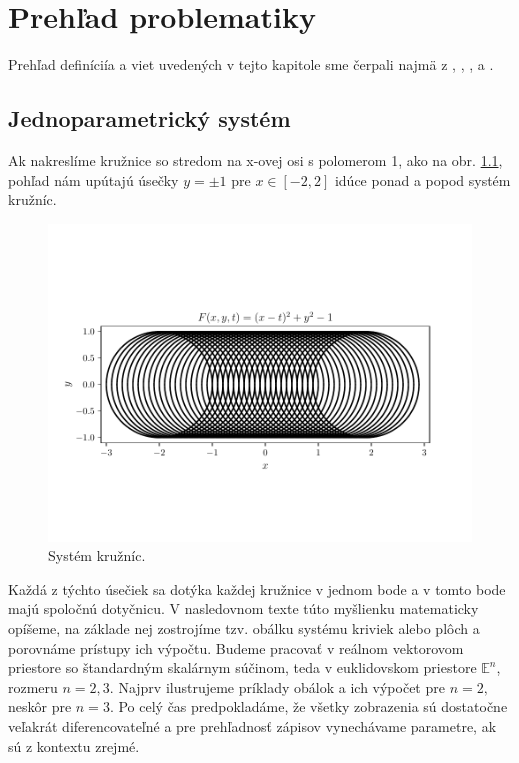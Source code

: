 \chapter{Prehľad problematiky}
\label{kap:kapitola1}
Prehľad definíciía a viet uvedených v tejto kapitole sme čerpali najmä z \cite{Bru92}, \cite{Bru81}, \cite{doCarmo17}, \cite{Ode20} a \cite{Vra22}.

\section{Jednoparametrický systém}
Ak nakreslíme kružnice so stredom na x-ovej osi s polomerom 1, ako na obr. \ref{fig:system}, pohľad nám upútajú úsečky $y = \pm 1$ pre $ x \in [-2,2]$ idúce ponad a popod systém kružníc.

\begin{figure}[h]
	\centering
	\includegraphics[trim={0.5cm 2.8cm 0.5cm 3.3cm},clip]{images/system.pdf}
	\caption[Systém kružníc.]{Systém kružníc.}
	\label{fig:system}
\end{figure}

Každá z týchto úsečiek sa dotýka každej kružnice v jednom bode a v tomto bode majú spoločnú dotyčnicu. V nasledovnom texte túto myšlienku matematicky opíšeme, na základe nej zostrojíme tzv. obálku systému kriviek alebo plôch a porovnáme prístupy ich výpočtu. Budeme pracovať v reálnom vektorovom priestore so štandardným skalárnym súčinom, teda v euklidovskom priestore $\mathbb{E}^{n}$, rozmeru $n = 2, 3.$ Najprv ilustrujeme príklady obálok a ich výpočet pre $ n = 2,$ neskôr pre $n = 3.$ Po celý čas predpokladáme, že všetky zobrazenia sú dostatočne veľakrát diferencovateľné a pre prehľadnosť zápisov vynechávame parametre, ak sú z kontextu zrejmé.

